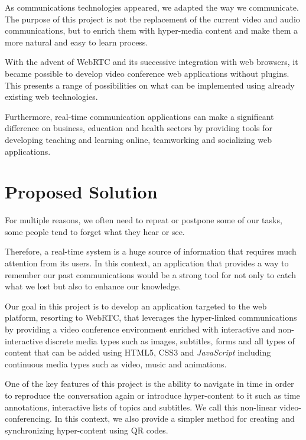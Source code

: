 	As communications technologies appeared, we adapted the way we communicate. The purpose of this project is not the replacement of the current video and audio communications, but to enrich them with hyper-media content and make them a more natural and easy to learn process. 

	With the advent of WebRTC and its successive integration with web browsers, it became possible to develop video conference web applications without plugins. This presents a range of possibilities on what can be implemented using already existing web technologies.
		
    Furthermore, real-time communication applications can make a significant difference on business, education and health sectors by providing tools for developing teaching and learning online, teamworking and socializing web applications.



\section{Proposed Solution}
\label{section:proposed}

	For multiple reasons, we often need to repeat or postpone some of our tasks, some people tend to forget what they hear or see.     
        
	Therefore, a real-time system is a huge source of information that requires much attention from its users. In this context, an application that provides a way to remember our past communications would be a strong tool for not only to catch what we lost but also to enhance our knowledge.

	Our goal in this project is to develop an application targeted to the web platform, resorting to \ac{WebRTC}, that leverages the hyper-linked communications by providing a video conference environment enriched with interactive and non-interactive discrete media types such as images, subtitles, forms and all types of content that can be added using \ac{HTML}5, \ac{CSS}3 and \emph{JavaScript} including continuous media types such as video, music and animations.

	One of the key features of this project is the ability to navigate in time in order to reproduce the conversation again or introduce hyper-content to it such as time annotations, interactive lists of topics and subtitles. We call this non-linear video-conferencing. In this context, we also provide a simpler method for creating and synchronizing hyper-content using \ac{QR} codes.

